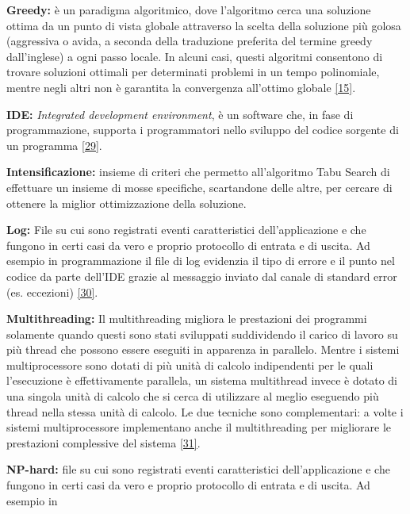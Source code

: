 \begin{description}
    \item \label{Greedy} \textbf{Greedy:} è un paradigma algoritmico, dove l'algoritmo cerca una soluzione ottima da un punto di vista globale attraverso la
     scelta della soluzione più golosa (aggressiva o avida, a seconda della traduzione preferita del termine greedy dall'inglese) a ogni passo locale. 
     In alcuni casi, questi algoritmi consentono di trovare soluzioni ottimali per determinati problemi in un tempo polinomiale, mentre negli altri non 
     è garantita la convergenza all'ottimo globale \hyperref[slide]{[15]}.
    \item \label{IDE} \textbf{IDE:} \textit{Integrated development environment}, è un software che, in fase di programmazione, supporta i programmatori nello sviluppo del codice sorgente di un programma \hyperref[ide]{[29]}.
    \item \label{Intensificazione} \textbf{Intensificazione:} insieme di criteri che permetto all'algoritmo Tabu Search di effettuare un insieme di mosse specifiche, scartandone delle
    altre, per cercare di ottenere la miglior ottimizzazione della soluzione.
    \item \label{Log} \textbf{Log:} File su cui sono registrati eventi caratteristici dell’applicazione e che fungono
    in certi casi da vero e proprio protocollo di entrata e di uscita. Ad esempio in
    programmazione il file di log evidenzia il tipo di errore e il punto nel codice
    da parte dell’IDE grazie al messaggio inviato dal canale di standard error (es. eccezioni) \hyperref[log]{[30]}.
    \item \label{Multithreading} \textbf{Multithreading:} Il multithreading migliora le prestazioni dei programmi solamente quando questi sono stati sviluppati suddividendo il carico di lavoro su più thread
     che possono essere eseguiti in apparenza in parallelo. Mentre i sistemi multiprocessore sono dotati di più unità di calcolo indipendenti per le quali l'esecuzione è effettivamente parallela, un sistema
     multithread invece è dotato di una singola unità di calcolo che si cerca di utilizzare al meglio eseguendo più thread nella stessa unità di calcolo. Le due tecniche sono complementari: a volte i sistemi
     multiprocessore implementano anche il multithreading per migliorare le prestazioni complessive del sistema \hyperref[multithread]{[31]}.
    \item \label{Np-hard} \textbf{NP-hard:} file su cui sono registrati eventi caratteristici dell’applicazione e che fungono
    in certi casi da vero e proprio protocollo di entrata e di uscita. Ad esempio in

\end{description}

